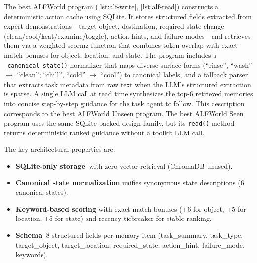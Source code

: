 The best ALFWorld program (\autoref{lst:alf-write}, \autoref{lst:alf-read}) constructs a deterministic action cache using SQLite.
It stores structured fields extracted from expert demonstrations---target object, destination, required state change (clean/cool/heat/examine/toggle), action hints, and failure modes---and retrieves them via a weighted scoring function that combines token overlap with exact-match bonuses for object, location, and state.
The program includes a \texttt{\_canonical\_state()} normalizer that maps diverse surface forms (``rinse'', ``wash'' $\to$ ``clean''; ``chill'', ``cold'' $\to$ ``cool'') to canonical labels, and a fallback parser that extracts task metadata from raw text when the LLM's structured extraction is sparse.
A single LLM call at read time synthesizes the top-6 retrieved memories into concise step-by-step guidance for the task agent to follow.
This description corresponds to the best ALFWorld Unseen program.
The best ALFWorld Seen program uses the same SQLite-backed design family, but its \texttt{read()} method returns deterministic ranked guidance without a toolkit LLM call.

The key architectural properties are:
\begin{itemize}
\item \textbf{SQLite-only storage}, with zero vector retrieval (ChromaDB unused).
\item \textbf{Canonical state normalization} unifies synonymous state descriptions (6 canonical states).
\item \textbf{Keyword-based scoring} with exact-match bonuses (+6 for object, +5 for location, +5 for state) and recency tiebreaker for stable ranking.
\item \textbf{Schema}: 8 structured fields per memory item (task\_summary, task\_type, target\_object, target\_location, required\_state, action\_hint, failure\_mode, keywords).
\end{itemize}

